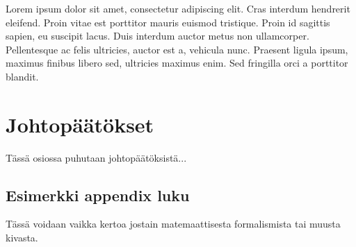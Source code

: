 \documentclass[titlepage]{article}
\begin{document}
Lorem ipsum dolor sit amet, consectetur adipiscing elit. Cras interdum hendrerit eleifend. Proin vitae est porttitor mauris euismod tristique. Proin id sagittis sapien, eu suscipit lacus. Duis interdum auctor metus non ullamcorper. Pellentesque ac felis ultricies, auctor est a, vehicula nunc. Praesent ligula ipsum, maximus finibus libero sed, ultricies maximus enim. Sed fringilla orci a porttitor blandit.

\newpage
\section{Johtopäätökset}

Tässä osiossa puhutaan johtopäätöksistä...

\newpage
\begin{appendix}

\section{Esimerkki appendix luku}

Tässä voidaan vaikka kertoa jostain matemaattisesta formalismista tai muusta kivasta.

\end{appendix}

\newpage
\printbibliography
\end{document}

